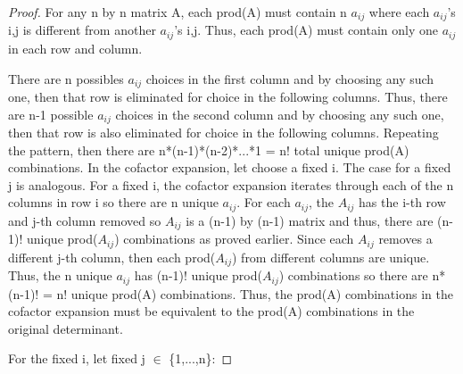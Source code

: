     \begin{proof}
        For any n by n matrix A, each prod(A) must contain n $a_{ij}$
        where each $a_{ij}$'s i,j is different from another $a_{ij}$'s i,j.
        Thus, each prod(A) must contain only one $a_{ij}$ in each row and column.
        
        There are n possibles $a_{ij}$ choices in the first column and by choosing
        any such one, then that row is eliminated for choice in the following
        columns. Thus, there are n-1 possible $a_{ij}$ choices in the second column
        and by choosing any such one, then that row is also eliminated for choice
        in the following columns. Repeating the pattern, then
        there are n*(n-1)*(n-2)*...*1 = n! total unique prod(A) combinations.
        In the cofactor expansion, let choose a fixed i. The case for a fixed j
        is analogous.
        For a fixed i, the cofactor expansion iterates through each of the n
        columns in row i so there are n unique $a_{ij}$.
        For each $a_{ij}$, the $A_{ij}$ has the i-th row and j-th column
        removed so $A_{ij}$ is a (n-1) by (n-1) matrix and thus, there
        are (n-1)! unique prod($A_{ij}$) combinations as proved earlier.
        Since each $A_{ij}$ removes a different j-th column, then each
        prod($A_{ij}$) from different columns are unique.
        Thus, the n unique $a_{ij}$ has (n-1)! unique prod($A_{ij}$) combinations
        so there are n*(n-1)! = n! unique prod(A) combinations.
        Thus, the prod(A) combinations in the cofactor expansion must be equivalent
        to the prod(A) combinations in the original determinant.

        For the fixed i, let fixed j $\in$ \{1,...,n\}:


\end{proof}
